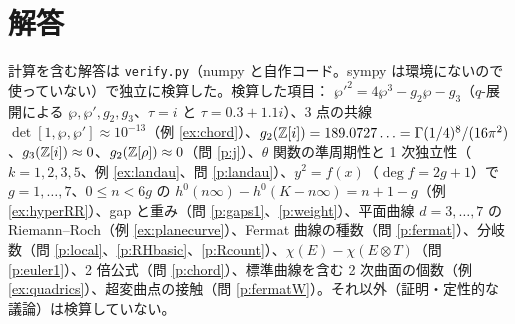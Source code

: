 \section*{解答}
計算を含む解答は \texttt{verify.py}（numpy と自作コード。sympy は環境にないので使っていない）で独立に検算した。検算した項目：
$\wp'^2=4\wp^3-g_2\wp-g_3$（$q$-展開による $\wp,\wp',g_2,g_3$、$\tau=i$ と $\tau=0.3+1.1i$）、3 点の共線 $\det[1,\wp,\wp']\approx10^{-13}$（例 \ref{ex:chord}）、$g_2(\mathbb Z[i])=189.0727\ldots=\Gamma(1/4)^8/(16\pi^2)$、$g_3(\mathbb Z[i])\approx0$、$g_2(\mathbb Z[\rho])\approx0$（問 \ref{p:j}）、$\theta$ 関数の準周期性と 1 次独立性（$k=1,2,3,5$、例 \ref{ex:landau}、問 \ref{p:landau}）、$y^2=f(x)$（$\deg f=2g+1$）で $g=1,\dots,7$、$0\le n<6g$ の $h^0(n\infty)-h^0(K-n\infty)=n+1-g$（例 \ref{ex:hyperRR}）、gap と重み（問 \ref{p:gaps1}、\ref{p:weight}）、平面曲線 $d=3,\dots,7$ の Riemann--Roch（例 \ref{ex:planecurve}）、Fermat 曲線の種数（問 \ref{p:fermat}）、分岐数（問 \ref{p:local}、\ref{p:RHbasic}、\ref{p:Rcount}）、$\chi(E)-\chi(E\otimes T)$（問 \ref{p:euler1}）、2 倍公式（問 \ref{p:chord}）、標準曲線を含む 2 次曲面の個数（例 \ref{ex:quadrics}）、超変曲点の接触（問 \ref{p:fermatW}）。それ以外（証明・定性的な議論）は検算していない。

